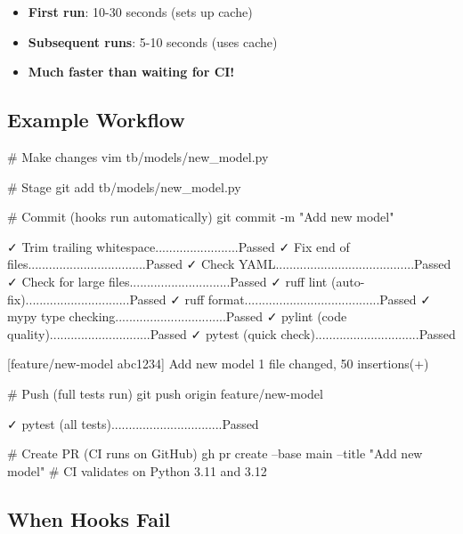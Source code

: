 \begin{record}

\begin{itemize}
\tightlist
\item
  \textbf{First run}: 10-30 seconds (sets up cache)
\item
  \textbf{Subsequent runs}: 5-10 seconds (uses cache)
\item
  \textbf{Much faster than waiting for CI!}
\end{itemize}

\end{record}

\subsection{Example Workflow}\label{cr:app:archive-pre-commit-setup-summary:example-workflow}

\begin{record}

\begin{textblock}
# Make changes
vim tb/models/new_model.py

# Stage
git add tb/models/new_model.py

# Commit (hooks run automatically)
git commit -m "Add new model"

✓ Trim trailing whitespace........................Passed
✓ Fix end of files..................................Passed
✓ Check YAML........................................Passed
✓ Check for large files.............................Passed
✓ ruff lint (auto-fix)..............................Passed
✓ ruff format.......................................Passed
✓ mypy type checking................................Passed
✓ pylint (code quality).............................Passed
✓ pytest (quick check)..............................Passed

[feature/new-model abc1234] Add new model
 1 file changed, 50 insertions(+)

# Push (full tests run)
git push origin feature/new-model

✓ pytest (all tests)................................Passed

# Create PR (CI runs on GitHub)
gh pr create --base main --title "Add new model"
# CI validates on Python 3.11 and 3.12
\end{textblock}

\end{record}

\subsection{When Hooks Fail}\label{cr:app:archive-pre-commit-setup-summary:when-hooks-fail}

